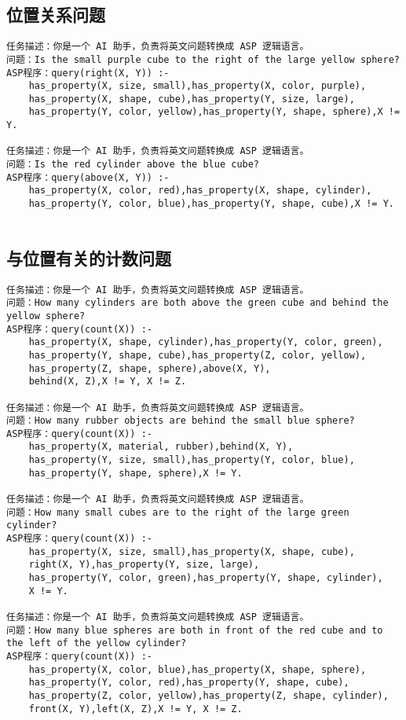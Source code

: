 \subsection{位置关系问题}
\begin{lstlisting}
任务描述：你是一个 AI 助手，负责将英文问题转换成 ASP 逻辑语言。
问题：Is the small purple cube to the right of the large yellow sphere?
ASP程序：query(right(X, Y)) :-
    has_property(X, size, small),has_property(X, color, purple),
    has_property(X, shape, cube),has_property(Y, size, large),
    has_property(Y, color, yellow),has_property(Y, shape, sphere),X != Y.

任务描述：你是一个 AI 助手，负责将英文问题转换成 ASP 逻辑语言。 
问题：Is the red cylinder above the blue cube?
ASP程序：query(above(X, Y)) :-
    has_property(X, color, red),has_property(X, shape, cylinder),
    has_property(Y, color, blue),has_property(Y, shape, cube),X != Y.


\end{lstlisting}
\subsection{与位置有关的计数问题}
\begin{lstlisting}
任务描述：你是一个 AI 助手，负责将英文问题转换成 ASP 逻辑语言。
问题：How many cylinders are both above the green cube and behind the yellow sphere?
ASP程序：query(count(X)) :-
    has_property(X, shape, cylinder),has_property(Y, color, green),
    has_property(Y, shape, cube),has_property(Z, color, yellow),
    has_property(Z, shape, sphere),above(X, Y),
    behind(X, Z),X != Y, X != Z.

任务描述：你是一个 AI 助手，负责将英文问题转换成 ASP 逻辑语言。
问题：How many rubber objects are behind the small blue sphere?
ASP程序：query(count(X)) :-
    has_property(X, material, rubber),behind(X, Y),
    has_property(Y, size, small),has_property(Y, color, blue),
    has_property(Y, shape, sphere),X != Y.

任务描述：你是一个 AI 助手，负责将英文问题转换成 ASP 逻辑语言。
问题：How many small cubes are to the right of the large green cylinder?
ASP程序：query(count(X)) :-
    has_property(X, size, small),has_property(X, shape, cube),
    right(X, Y),has_property(Y, size, large),
    has_property(Y, color, green),has_property(Y, shape, cylinder),
    X != Y.

任务描述：你是一个 AI 助手，负责将英文问题转换成 ASP 逻辑语言。
问题：How many blue spheres are both in front of the red cube and to the left of the yellow cylinder?
ASP程序：query(count(X)) :-
    has_property(X, color, blue),has_property(X, shape, sphere),
    has_property(Y, color, red),has_property(Y, shape, cube),
    has_property(Z, color, yellow),has_property(Z, shape, cylinder),
    front(X, Y),left(X, Z),X != Y, X != Z.
\end{lstlisting}
